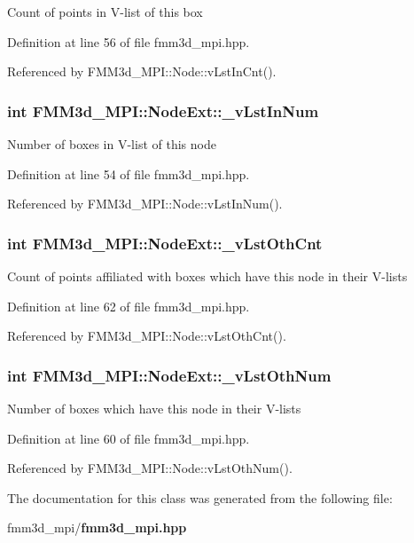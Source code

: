 Count of points in V-list of this box 

Definition at line 56 of file fmm3d\_\-mpi.hpp.

Referenced by FMM3d\_\-MPI::Node::v\-Lst\-In\-Cnt().
\subsubsection{\setlength{\rightskip}{0pt plus 5cm}int {\bf FMM3d\_\-MPI::Node\-Ext::\_\-v\-Lst\-In\-Num}}\label{classFMM3d__MPI_1_1NodeExt_baca27a63bfddc35f8cf78fd0c9bf79c_baca27a63bfddc35f8cf78fd0c9bf79c}


Number of boxes in V-list of this node 

Definition at line 54 of file fmm3d\_\-mpi.hpp.

Referenced by FMM3d\_\-MPI::Node::v\-Lst\-In\-Num().
\subsubsection{\setlength{\rightskip}{0pt plus 5cm}int {\bf FMM3d\_\-MPI::Node\-Ext::\_\-v\-Lst\-Oth\-Cnt}}\label{classFMM3d__MPI_1_1NodeExt_85e50680c1c91c3af519f6408dcbc18d_85e50680c1c91c3af519f6408dcbc18d}


Count of points affiliated with boxes which have this node in their V-lists 

Definition at line 62 of file fmm3d\_\-mpi.hpp.

Referenced by FMM3d\_\-MPI::Node::v\-Lst\-Oth\-Cnt().
\subsubsection{\setlength{\rightskip}{0pt plus 5cm}int {\bf FMM3d\_\-MPI::Node\-Ext::\_\-v\-Lst\-Oth\-Num}}\label{classFMM3d__MPI_1_1NodeExt_bf022cfcbdeae8ed0e56d1d3dff79f4f_bf022cfcbdeae8ed0e56d1d3dff79f4f}


Number of boxes which have this node in their V-lists 

Definition at line 60 of file fmm3d\_\-mpi.hpp.

Referenced by FMM3d\_\-MPI::Node::v\-Lst\-Oth\-Num().

The documentation for this class was generated from the following file:\begin{CompactItemize}
\item 
fmm3d\_\-mpi/{\bf fmm3d\_\-mpi.hpp}\end{CompactItemize}
